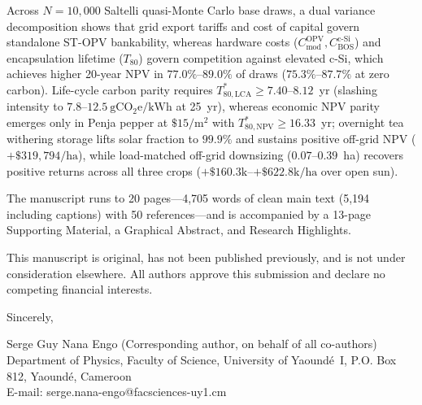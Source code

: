 \documentclass[10pt,a4paper]{article}
\begin{document}
Across $N=10,000$ Saltelli quasi-Monte Carlo base draws, a dual variance decomposition shows that grid export tariffs and cost of capital govern standalone ST-OPV bankability, whereas hardware costs ($C_{\mathrm{mod}}^{\mathrm{OPV}}, C_{\mathrm{BOS}}^{\mathrm{c\text{-}Si}}$) and encapsulation lifetime ($T_{80}$) govern competition against elevated c-Si, which achieves higher 20-year NPV in $77.0\%$--$89.0\%$ of draws ($75.3\%$--$87.7\%$ at zero carbon). Life-cycle carbon parity requires $T_{80,\mathrm{LCA}}^* \ge 7.40$--$8.12$~yr (slashing intensity to $7.8$--$12.5~\mathrm{gCO_2e/kWh}$ at 25~yr), whereas economic NPV parity emerges only in Penja pepper at $\$15/\mathrm{m}^2$ with $T_{80,\mathrm{NPV}}^* \ge 16.33$~yr; overnight tea withering storage lifts solar fraction to $99.9\%$ and sustains positive off-grid NPV ($+\$319,794/\mathrm{ha}$), while load-matched off-grid downsizing ($0.07$--$0.39$~ha) recovers positive returns across all three crops ($+\$160.3\mathrm{k}$--$+\$622.8\mathrm{k}/\mathrm{ha}$ over open sun).

The manuscript runs to 20 pages---4,705 words of clean main text (5,194 including captions) with 50 references---and is accompanied by a 13-page Supporting Material, a Graphical Abstract, and Research Highlights.

This manuscript is original, has not been published previously, and is not under consideration elsewhere. All authors approve this submission and declare no competing financial interests.

\vspace{0.6em}
\noindent
Sincerely,

\vspace{0.5em}
\noindent
Serge Guy Nana Engo (Corresponding author, on behalf of all co-authors)\\
Department of Physics, Faculty of Science, University of Yaound\'e~I, P.O. Box 812, Yaound\'e, Cameroon\\
E-mail: serge.nana-engo@facsciences-uy1.cm
\end{document}
